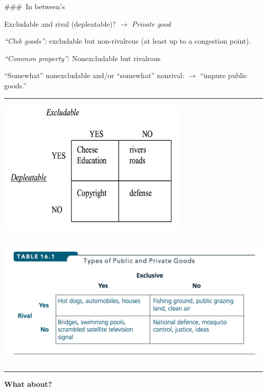 \documentclass[]{article}
\begin{document}
\#\#\#~In between's

Excludable and rival (depleatable)? \(\rightarrow\) \emph{Private good}

\bigskip

\emph{``Club goods'':} excludable but non-rivalrous (at least up to a
congestion point).

\bigskip

\emph{``Common property''}: Nonexcludable but rivalrous

\bigskip

``Somewhat'' nonexcludable and/or ``somewhat'' nonrival: \(\rightarrow\)
``impure public goods.''

\begin{center}\rule{0.5\linewidth}{\linethickness}\end{center}

\includegraphics[height=2.5in]{picsfigs/rivalexcludabletable1.png}

\includegraphics[height=2.5in]{picsfigs/rivalexcludabletable.png}

\begin{center}\rule{0.5\linewidth}{\linethickness}\end{center}

\textbf{What about?}
\end{document}

